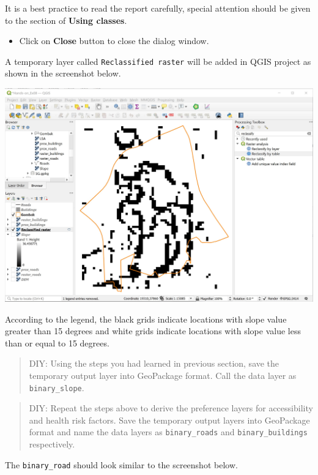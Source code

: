 \documentclass[
  letterpaper,
  DIV=11,
  numbers=noendperiod]{scrreprt}
\providecommand{\tightlist}{%
  \setlength{\itemsep}{0pt}\setlength{\parskip}{0pt}}\usepackage{longtable,booktabs,array}
\begin{document}
It is a best practice to read the report carefully, special attention
should be given to the section of \textbf{Using classes}.

\begin{itemize}
\tightlist
\item
  Click on \textbf{Close} button to close the dialog window.
\end{itemize}

A temporary layer called \texttt{Reclassified\ raster} will be added in
QGIS project as shown in the screenshot below.

\includegraphics{./img07/image37.jpg}

According to the legend, the black grids indicate locations with slope
value greater than 15 degrees and white grids indicate locations with
slope value less than or equal to 15 degrees.

\begin{quote}
DIY: Using the steps you had learned in previous section, save the
temporary output layer into GeoPackage format. Call the data layer as
\texttt{binary\_slope}.
\end{quote}

\begin{quote}
DIY: Repeat the steps above to derive the preference layers for
accessibility and health risk factors. Save the temporary output layers
into GeoPackage format and name the data layers as
\texttt{binary\_roads} and \texttt{binary\_buildings} respectively.
\end{quote}

The \texttt{binary\_road} should look similar to the screenshot below.
\end{document}
